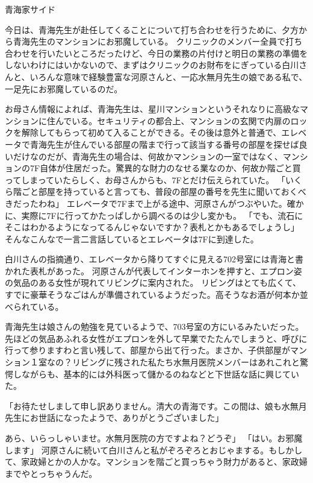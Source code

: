 青海家サイド

今日は、青海先生が赴任してくることについて打ち合わせを行うために、夕方から青海先生のマンションにお邪魔している。
クリニックのメンバー全員で打ち合わせを行いたいところだったけど、今日の業務の片付けと明日の業務の準備をしないわけにはいかないので、まずはクリニックのお財布をにぎっている白川さんと、いろんな意味で経験豊富な河原さんと、一応水無月先生の娘である私で、一足先にお邪魔しているのだ。

お母さん情報によれば、青海先生は、星川マンションというそれなりに高級なマンションに住んでいる。セキュリティの都合上、マンションの玄関で内扉のロックを解除してもらって初めて入ることができる。その後は意外と普通で、エレベータで青海先生が住んでいる部屋の階まで行って該当する番号の部屋を探せば良いだけなのだが、青海先生の場合は、何故かマンションの一室ではなく、マンションの7F自体が住居だった。驚異的な財力のなせる業なのか、何故か階ごと買ってしまっていたらしく、お母さんからも、7Fとだけ伝えられていた。
「いくら階ごと部屋を持っていると言っても、普段の部屋の番号を先生に聞いておくべきだったわね」
エレベータで7Fまで上がる途中、河原さんがつぶやいた。確かに、実際に7Fに行ってかたっぱしから調べるのは少し変かも。
「でも、流石にそこはわかるようになってるんじゃないですか？表札とかもあるでしょうし」
そんなこんなで一言二言話しているとエレベータは7Fに到達した。

白川さんの指摘通り、エレベータから降りてすぐに見える702号室には青海と書かれた表札があった。
河原さんが代表してインターホンを押すと、エプロン姿の気品のある女性が現れてリビングに案内された。
リビングはとても広くて、すでに豪華そうなごはんが準備されているようだった。高そうなお酒が何本か並べられている。

青海先生は娘さんの勉強を見ているようで、703号室の方にいるみたいだった。先ほどの気品あふれる女性がエプロンを外して早業でたたんでしまうと、呼びに行って参りますわと言い残して、部屋から出て行った。まさか、子供部屋がマンション１室なの？リビングに残された私たち水無月医院メンバーはあれこれと驚愕しながらも、基本的には外科医って儲かるのねなどと下世話な話に興じていた。

「お待たせしまして申し訳ありません。清大の青海です。この間は、娘も水無月先生にお世話になったようで、ありがとうございました」


あら、いらっしゃいませ。水無月医院の方ですよね？どうぞ」
「はい。お邪魔します」
河原さんに続いて白川さんと私がぞろぞろとおじゃまする。もしかして、家政婦とかの人かな。マンションを階ごと買っちゃう財力があると、家政婦までやとっちゃうんだ。



